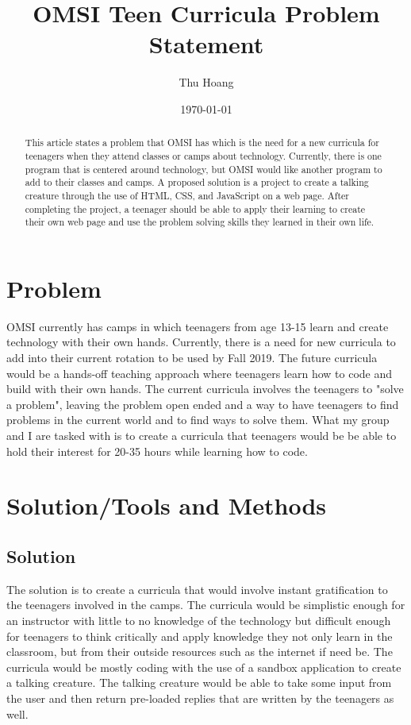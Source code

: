 \documentclass[10pt, letterpaper]{article}
\title{OMSI Teen Curricula Problem Statement}
\author{Thu Hoang}
\date{\today}
\begin{document}
\maketitle
\begin{abstract}
    This article states a problem that OMSI has which is the need for a new curricula for teenagers when they attend classes or camps about technology. Currently, there is one program that is centered around technology, but OMSI would like another program to add to their classes and camps. A proposed solution is a project to create a talking creature through the use of HTML, CSS, and JavaScript on a web page. After completing the project, a teenager should be able to apply their learning to create their own web page and use the problem solving skills they learned in their own life.
    
\end{abstract}
\newpage
\section{Problem}
    OMSI currently has camps in which teenagers from age 13-15 learn and create technology with their own hands. Currently, there is a need for new curricula to add into their current rotation to be used by Fall 2019. The future curricula would be a hands-off teaching approach where teenagers learn how to code and build with their own hands. The current curricula involves the teenagers to "solve a problem", leaving the problem open ended and a way to have teenagers to find problems in the current world and to find ways to solve them. What my group and I are tasked with is to create a curricula that teenagers would be be able to hold their interest for 20-35 hours while learning how to code.
    
\section{Solution/Tools and Methods}
\subsection{Solution}
    The solution is to create a curricula that would involve instant gratification to the teenagers involved in the camps. The curricula would be simplistic enough for an instructor with little to no knowledge of the technology but difficult enough for teenagers to think critically and apply knowledge they not only learn in the classroom, but from their outside resources such as the internet if need be. The curricula would be mostly coding with the use of a sandbox application to create a talking creature. The talking creature would be able to take some input from the user and then return pre-loaded replies that are written by the teenagers as well.
    
\end{document}
